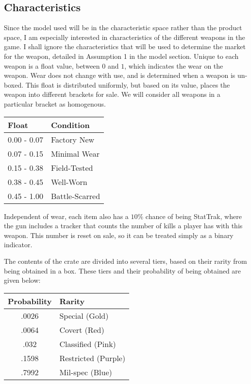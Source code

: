 \documentclass[12pt]{paper}
\begin{document}
\subsection{Characteristics}

Since the model used will be in the characteristic space rather than
the product space, I am especially interested in characteristics of
the different weapons in the game. I shall ignore the characteristics
that will be used to determine the market for the weapon, detailed in
Assumption 1 in the model section. Unique to each weapon is a float
value, between $0$ and $1$, which indicates the wear on the
weapon. Wear does not change with use, and is determined when a weapon
is un-boxed. This float is distributed uniformly, but based on its
value, places the weapon into different brackets for sale. We will
consider all weapons in a particular bracket as homogenous.
\begin{center}
\begin{tabular}{|l|l|}\hline
  Float & Condition\\\hline
  0.00 - 0.07 & Factory New\\
  0.07 - 0.15 & Minimal Wear\\
  0.15 - 0.38 & Field-Tested\\
  0.38 - 0.45 & Well-Worn\\
  0.45 - 1.00 & Battle-Scarred\\\hline
\end{tabular}
\end{center}

Independent of wear, each item
also has a $10\%$ chance of being StatTrak\texttrademark, where the
gun includes a tracker that counts the number of kills a player has
with this weapon. This number is reset on sale, so it can be treated
simply as a binary indicator.

The contents of the crate are divided into several tiers, based on
their rarity from being obtained in a box. These tiers and their
probability of being obtained are given below:

\begin{center}
\begin{tabular}{|c|l|}\hline
Probability & Rarity\\\hline
.0026 & Special (Gold)\\
.0064 & Covert (Red)\\
.032 & Classified (Pink)\\
.1598 & Restricted (Purple)\\
.7992 & Mil-spec (Blue)\\\hline
\end{tabular}
\end{center}
\end{document}
